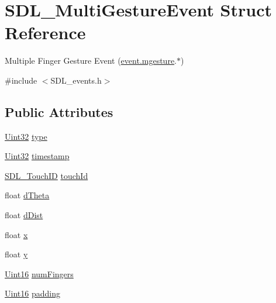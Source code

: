 \hypertarget{struct_s_d_l___multi_gesture_event}{}\section{S\+D\+L\+\_\+\+Multi\+Gesture\+Event Struct Reference}
\label{struct_s_d_l___multi_gesture_event}


Multiple Finger Gesture Event (\hyperlink{union_s_d_l___event_ac19b3c6a6b5181a51eb4fbe2cbe726a9}{event.\+mgesture}.$\ast$)  




{\ttfamily \#include $<$S\+D\+L\+\_\+events.\+h$>$}

\subsection*{Public Attributes}
\begin{DoxyCompactItemize}
\item 
\hyperlink{_s_d_l__stdinc_8h_add440eff171ea5f55cb00c4a9ab8672d}{Uint32} \hyperlink{struct_s_d_l___multi_gesture_event_ab0c7adc9a3f71cc3532bfe0ff8cc6120}{type}
\item 
\hyperlink{_s_d_l__stdinc_8h_add440eff171ea5f55cb00c4a9ab8672d}{Uint32} \hyperlink{struct_s_d_l___multi_gesture_event_a7e99a98debf3ce11f6d2a2fbb3637175}{timestamp}
\item 
\hyperlink{_s_d_l__touch_8h_a10f5f86abe4ea8308a8706bd5d3b337a}{S\+D\+L\+\_\+\+Touch\+ID} \hyperlink{struct_s_d_l___multi_gesture_event_aa15d1201559a3c9277082af71a972dc1}{touch\+Id}
\item 
float \hyperlink{struct_s_d_l___multi_gesture_event_a4f4a920dcf5205baa24a140df56f3153}{d\+Theta}
\item 
float \hyperlink{struct_s_d_l___multi_gesture_event_a351c29785c5ce3f68c4591a427265f14}{d\+Dist}
\item 
float \hyperlink{struct_s_d_l___multi_gesture_event_a1708fc3c788fd12cc0beb5dc05cf31ca}{x}
\item 
float \hyperlink{struct_s_d_l___multi_gesture_event_a264602b9c5cc027eb6a283adda428454}{y}
\item 
\hyperlink{_s_d_l__stdinc_8h_a31fcc0a076c9068668173ee26d33e42b}{Uint16} \hyperlink{struct_s_d_l___multi_gesture_event_a6b06cf80372ce3cad40110fdb6ef0353}{num\+Fingers}
\item 
\hyperlink{_s_d_l__stdinc_8h_a31fcc0a076c9068668173ee26d33e42b}{Uint16} \hyperlink{struct_s_d_l___multi_gesture_event_a4804ec87789e697aba138c4888bb304b}{padding}
\end{DoxyCompactItemize}


